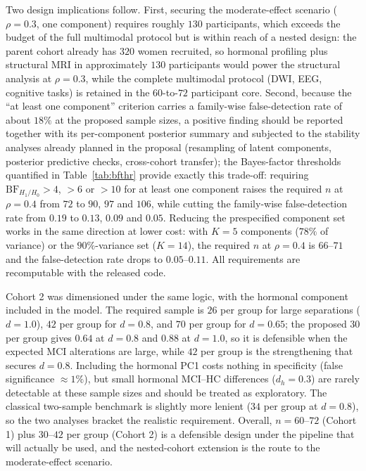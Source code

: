 \documentclass[11pt,a4paper]{article}
\newcommand{\BF}{\mathrm{BF}}
\begin{document}
Two design implications follow. First, securing the moderate-effect scenario ($\rho=0.3$, one component) requires roughly $130$ participants, which exceeds the budget of the full multimodal protocol but is within reach of a nested design: the parent cohort already has $320$ women recruited, so hormonal profiling plus structural MRI in approximately $130$ participants would power the structural analysis at $\rho=0.3$, while the complete multimodal protocol (DWI, EEG, cognitive tasks) is retained in the $60$-to-$72$ participant core. Second, because the ``at least one component'' criterion carries a family-wise false-detection rate of about $18\%$ at the proposed sample sizes, a positive finding should be reported together with its per-component posterior summary and subjected to the stability analyses already planned in the proposal (resampling of latent components, posterior predictive checks, cross-cohort transfer); the Bayes-factor thresholds quantified in Table~\ref{tab:bfthr} provide exactly this trade-off: requiring $\BF_{H_1/H_0}>4$, $>6$ or $>10$ for at least one component raises the required $n$ at $\rho=0.4$ from $72$ to $90$, $97$ and $106$, while cutting the family-wise false-detection rate from $0.19$ to $0.13$, $0.09$ and $0.05$. Reducing the prespecified component set works in the same direction at lower cost: with $K=5$ components ($78\%$ of variance) or the $90\%$-variance set ($K=14$), the required $n$ at $\rho=0.4$ is $66$--$71$ and the false-detection rate drops to $0.05$--$0.11$. All requirements are recomputable with the released code.

Cohort 2 was dimensioned under the same logic, with the hormonal component included in the model. The required sample is $26$ per group for large separations ($d=1.0$), $42$ per group for $d=0.8$, and $70$ per group for $d=0.65$; the proposed $30$ per group gives $0.64$ at $d=0.8$ and $0.88$ at $d=1.0$, so it is defensible when the expected MCI alterations are large, while $42$ per group is the strengthening that secures $d=0.8$. Including the hormonal PC1 costs nothing in specificity (false significance $\approx1\%$), but small hormonal MCI--HC differences ($d_h=0.3$) are rarely detectable at these sample sizes and should be treated as exploratory. The classical two-sample benchmark is slightly more lenient ($34$ per group at $d=0.8$), so the two analyses bracket the realistic requirement. Overall, $n=60$--$72$ (Cohort 1) plus $30$--$42$ per group (Cohort 2) is a defensible design under the pipeline that will actually be used, and the nested-cohort extension is the route to the moderate-effect scenario.
\end{document}
